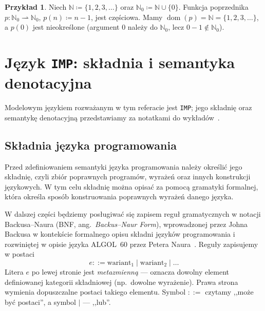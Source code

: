 \documentclass[11pt,a4paper]{article}
\theoremstyle{definition}
\newtheorem{uwaga}[definicja]{Uwaga}
\newtheorem{przyklad}[definicja]{Przykład}
\theoremstyle{plain}
\newcommand{\dom}{\operatorname{dom}}
\begin{document}
\begin{przyklad}\label{prz:poprzednik}
Niech $\mathbb{N}\coloneqq\{1,2,3,\dots\}$ oraz $\mathbb{N}_0\coloneqq\mathbb{N}\cup\{0\}$. Funkcja
poprzednika $p:\mathbb{N}_0\rightharpoonup\mathbb{N}_0$, $p(n)\coloneqq n-1$, jest częściowa. Mamy
$\dom(p)=\mathbb{N}=\{1,2,3,\dots\}$, a $p(0)$ jest nieokreślone (argument $0$ należy
do $\mathbb{N}_0$, lecz $0-1\notin\mathbb{N}_0$).
\end{przyklad}

\section{Język \texttt{IMP}: składnia i semantyka denotacyjna}

Modelowym językiem rozważanym w tym referacie jest \texttt{IMP}; jego składnię
oraz semantykę denotacyjną przedstawiamy za notatkami do wykładów~\cite{cs152denot,cs4110denot}.

\subsection{Składnia języka programowania}

Przed zdefiniowaniem semantyki języka programowania należy określić jego składnię,
czyli zbiór poprawnych programów, wyrażeń oraz innych konstrukcji językowych.
W tym celu składnię można opisać za pomocą gramatyki formalnej, która określa
sposób konstruowania poprawnych wyrażeń danego języka.

W dalszej części będziemy posługiwać się zapisem reguł gramatycznych w notacji
Backusa--Naura (BNF, ang.\ \emph{Backus--Naur Form}), wprowadzonej przez Johna
Backusa w kontekście formalnego opisu składni języków programowania i rozwiniętej
w opisie języka ALGOL~60 przez Petera Naura~\cite{naur1960}. Reguły zapisujemy
w postaci
\[
e ::= \text{wariant}_1 \mid \text{wariant}_2 \mid \ldots
\]
Litera $e$ po lewej stronie jest \emph{metazmienną} --- oznacza dowolny element
definiowanej kategorii składniowej (np.\ dowolne wyrażenie). Prawa strona
wymienia dopuszczalne postaci takiego elementu. Symbol $::=$ czytamy
,,może być postaci'', a symbol $\mid$ --- ,,lub''.
\end{document}
